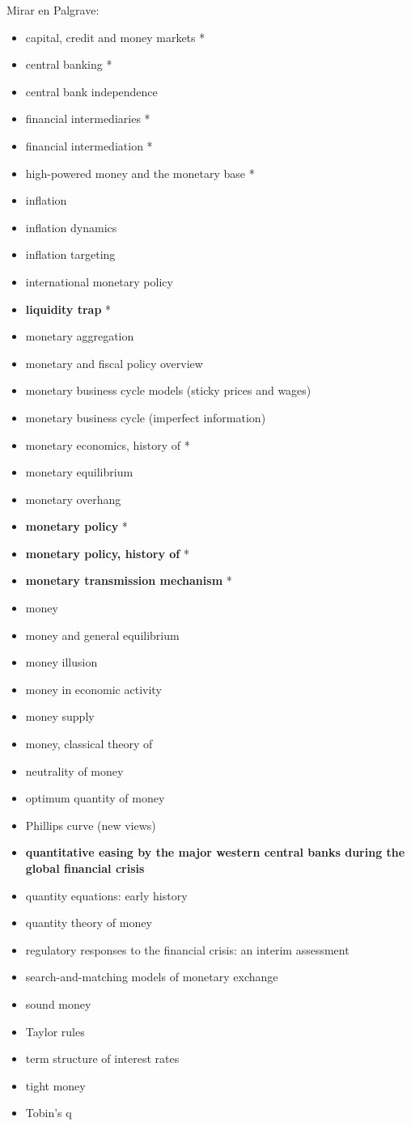 \documentclass{nuevotema}
\begin{document}
Mirar en Palgrave:
\begin{itemize}
	\item capital, credit and money markets *
	\item central banking *
	\item central bank independence
	\item financial intermediaries *
	\item financial intermediation *
	\item high-powered money and the monetary base *
	\item inflation
	\item inflation dynamics
	\item inflation targeting
	\item international monetary policy
	\item \textbf{liquidity trap} *
	\item monetary aggregation
	\item monetary and fiscal policy overview
	\item monetary business cycle models (sticky prices and wages)
	\item monetary business cycle (imperfect information)
	\item monetary economics, history of *
	\item monetary equilibrium
	\item monetary overhang
	\item \textbf{monetary policy} *
	\item \textbf{monetary policy, history of} *
	\item \textbf{monetary transmission mechanism} *
	\item money
	\item money and general equilibrium
	\item money illusion
	\item money in economic activity
	\item money supply
	\item money, classical theory of
	\item neutrality of money
	\item optimum quantity of money
	\item Phillips curve (new views)
	\item \textbf{quantitative easing by the major western central banks during the global financial crisis}
	\item quantity equations: early history
	\item quantity theory of money
	\item regulatory responses to the financial crisis: an interim assessment
	\item search-and-matching models of monetary exchange
	\item sound money
	\item Taylor rules
	\item term structure of interest rates
	\item tight money
	\item Tobin's q
\end{itemize}
\end{document}
